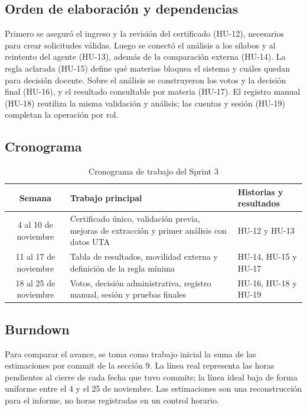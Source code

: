 \subsection{Orden de elaboración y dependencias}
Primero se aseguró el ingreso y la revisión del certificado (HU-12), necesarios para crear solicitudes válidas. Luego se conectó el análisis a los sílabos y al reintento del agente (HU-13), además de la comparación externa (HU-14). La regla aclarada (HU-15) define qué materias bloquea el sistema y cuáles quedan para decisión docente. Sobre el análisis se construyeron los votos y la decisión final (HU-16), y el resultado consultable por materia (HU-17). El registro manual (HU-18) reutiliza la misma validación y análisis; las cuentas y sesión (HU-19) completan la operación por rol.

\subsection{Cronograma}
\begin{table}[H]\centering\small
\begin{tabularx}{\textwidth}{|c|X|X|}\hline
\rowcolor{grisTarjeta}\textbf{Semana} & \textbf{Trabajo principal} & \textbf{Historias y resultados}\\\hline
4 al 10 de noviembre & Certificado único, validación previa, mejoras de extracción y primer análisis con datos UTA & HU-12 y HU-13\\\hline
11 al 17 de noviembre & Tabla de resultados, movilidad externa y definición de la regla mínima & HU-14, HU-15 y HU-17\\\hline
18 al 25 de noviembre & Votos, decisión administrativa, registro manual, sesión y pruebas finales & HU-16, HU-18 y HU-19\\\hline
\end{tabularx}\caption{Cronograma de trabajo del Sprint 3}
\end{table}

\subsection{Burndown}
Para comparar el avance, se toma como trabajo inicial la suma de las estimaciones por commit de la sección 9. La línea real representa las horas pendientes al cierre de cada fecha que tuvo commits; la línea ideal baja de forma uniforme entre el 4 y el 25 de noviembre. Las estimaciones son una reconstrucción para el informe, no horas registradas en un control horario.

